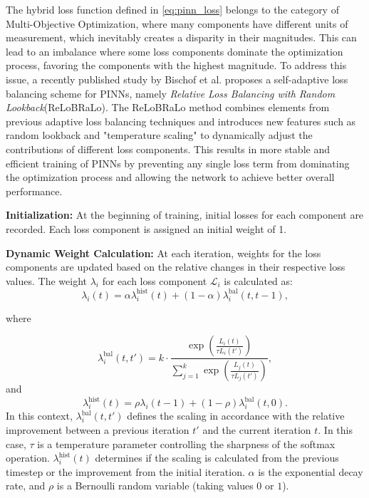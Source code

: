 The hybrid loss function defined in \eqref{eq:pinn_loss} belongs to the category of Multi-Objective Optimization, where many components have different units of measurement, which inevitably creates a disparity in their magnitudes. This can lead to an imbalance where some loss components dominate the optimization process, favoring the components with the highest magnitude. To address this issue, a recently published study by Bischof et al. \cite{ReLoBRaLo} proposes a self-adaptive loss balancing scheme for PINNs, namely \emph{Relative Loss Balancing with Random Lookback}(ReLoBRaLo). The ReLoBRaLo method combines elements from previous adaptive loss balancing techniques and introduces new features such as random lookback and "temperature scaling" to dynamically adjust the contributions of different loss components. This results in more stable and efficient training of PINNs by preventing any single loss term from dominating the optimization process and allowing the network to achieve better overall performance.



\textbf{Initialization:} At the beginning of training, initial losses for each component are recorded. Each loss component is assigned an initial weight of 1.

\textbf{Dynamic Weight Calculation:} At each iteration, weights for the loss components are updated based on the relative changes in their respective loss values. The weight \(\lambda_i\) for each loss component \(\mathcal{L}_i\) is calculated as:
\begin{equation}
\lambda_i(t) = \alpha \lambda_i^{\text{hist}}(t) + (1 - \alpha) \lambda_i^{\text{bal}}(t, t-1),
\end{equation}

where

\begin{equation}
\lambda_i^{\text{bal}}(t, t') = k \cdot \frac{\exp \left( \frac{L_i(t)}{\tau L_i(t')} \right)}{\sum_{j=1}^k \exp \left( \frac{L_j(t)}{\tau L_j(t')} \right)},
\end{equation}
and
\begin{equation}
\lambda_i^{\text{hist}}(t) = \rho \lambda_i(t-1) + (1 - \rho) \lambda_i^{\text{bal}}(t, 0).
\end{equation}
In this context, $\lambda_i^{\text{bal}}(t, t')$ defines the scaling in accordance with the relative improvement between a previous iteration $t'$ and the current iteration $t$. In this case, $\tau$ is a temperature parameter controlling the sharpness of the softmax operation.
$\lambda_i^{\text{hist}}(t)$ determines if the scaling is calculated from the previous timestep or the improvement from the initial iteration.
\(\alpha\) is the exponential decay rate, and \(\rho\) is a Bernoulli random variable (taking values $0$ or $1$).













